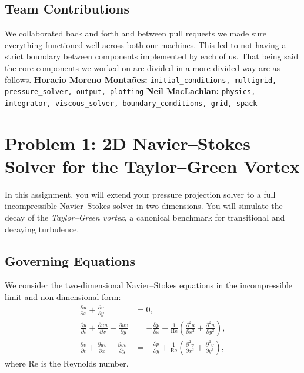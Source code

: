\subsection*{Team Contributions}
We collaborated back and forth and between pull requests we made sure everything functioned well across both our machines. 
This led to not having a strict boundary between components implemented by each of us. That being said the core components we worked on are divided
in a more divided way are as follows. \newline
\textbf{Horacio Moreno Monta\~nes:} \lstinline{initial_conditions, multigrid, pressure_solver, output, plotting} \newline
\textbf{Neil MacLachlan:} \lstinline{physics, integrator, viscous_solver, boundary_conditions, grid, spack}
\section*{Problem 1: 2D Navier--Stokes Solver for the Taylor--Green Vortex}

In this assignment, you will extend your pressure projection solver to a full incompressible Navier--Stokes solver in two dimensions. You will simulate the decay of the \emph{Taylor--Green vortex}, a canonical benchmark for transitional and decaying turbulence.

\subsection*{Governing Equations}

We consider the two-dimensional Navier--Stokes equations in the incompressible limit and non-dimensional form:
\begin{align}
  \frac{\partial u}{\partial x} + \frac{\partial v}{\partial y} &= 0, \label{eq:continuity} \\
  \frac{\partial u}{\partial t} + \frac{\partial uu}{\partial x} + \frac{\partial uv}{\partial y} &= -\frac{\partial p}{\partial x} + \frac{1}{\mathrm{Re}} \left( \frac{\partial^2 u}{\partial x^2} + \frac{\partial^2 u}{\partial y^2} \right), \label{eq:umom} \\
  \frac{\partial v}{\partial t} + \frac{\partial uv}{\partial x} + \frac{\partial vv}{\partial y} &= -\frac{\partial p}{\partial y} + \frac{1}{\mathrm{Re}} \left( \frac{\partial^2 v}{\partial x^2} + \frac{\partial^2 v}{\partial y^2} \right), \label{eq:vmom}
\end{align}
where $\mathrm{Re}$ is the Reynolds number.


